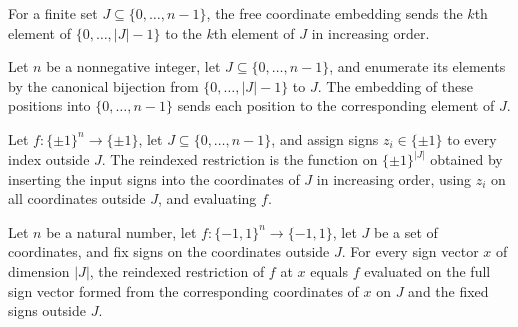 \begin{definition}
\label{FABL.freeCoordinateEmbedding}
\leanok
For a finite set $J\subseteq\{0,\ldots,n-1\}$, the free coordinate embedding sends the
$k$th element of $\{0,\ldots,|J|-1\}$ to the $k$th element of $J$ in increasing order.
\end{definition}

\begin{theorem}
\label{FABL.freeCoordinateEmbedding_equivFin}
\leanok
{}
Let $n$ be a nonnegative integer, let $J\subseteq\{0,\ldots,n-1\}$, and enumerate its
elements by the canonical bijection from $\{0,\ldots,|J|-1\}$ to $J$. The embedding of
these positions into $\{0,\ldots,n-1\}$ sends each position to the corresponding element
of $J$.
\end{theorem}

\begin{definition}
\label{FABL.reindexedSignRestriction}
\leanok
{}
Let $f:\{\pm1\}^n\to\{\pm1\}$, let $J\subseteq\{0,\ldots,n-1\}$, and assign signs
$z_i\in\{\pm1\}$ to every index outside $J$. The reindexed restriction is the function
on $\{\pm1\}^{|J|}$ obtained by inserting the input signs into the coordinates of $J$ in
increasing order, using $z_i$ on all coordinates outside $J$, and evaluating $f$.
\end{definition}

\begin{theorem}
\label{FABL.reindexedSignRestriction_apply}
\leanok
{}
Let $n$ be a natural number, let $f\colon\{-1,1\}^n\to\{-1,1\}$, let $J$ be a set of
coordinates, and fix signs on the coordinates outside $J$. For every sign vector $x$ of
dimension $|J|$, the reindexed restriction of $f$ at $x$ equals $f$ evaluated on the
full sign vector formed from the corresponding coordinates of $x$ on $J$ and the fixed
signs outside $J$.
\end{theorem}

